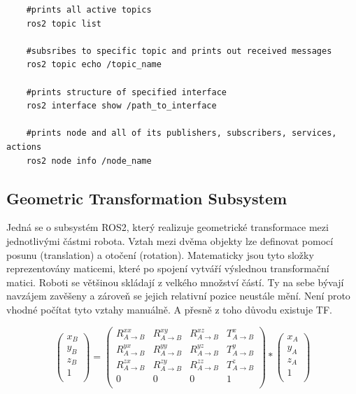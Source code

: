\begin{verbatim}
	#prints all active topics
	ros2 topic list 
	
	#subsribes to specific topic and prints out received messages
	ros2 topic echo /topic_name
	
	#prints structure of specified interface
	ros2 interface show /path_to_interface
	
	#prints node and all of its publishers, subscribers, services, actions
	ros2 node info /node_name
\end{verbatim}

\subsection*{Geometric Transformation Subsystem} \label{theory:tf}
Jedná se o subsystém ROS2, který realizuje geometrické transformace mezi jednotlivými částmi robota.
Vztah mezi dvěma objekty lze definovat pomocí posunu (translation) a otočení (rotation). Matematicky jsou tyto složky reprezentovány maticemi, které po spojení vytváří výslednou transformační matici. Roboti se většinou skládají z velkého množství částí. Ty na sebe bývají navzájem zavěšeny a zároveň se jejich relativní pozice neustále mění. Není proto vhodné počítat tyto vztahy manuálně. A přesně z toho důvodu existuje TF. \cite[str:~63-67]{ros2_introduction}

\begin{equation}
	\begin{pmatrix}
		x_B\\
		y_B\\
		z_B\\
		1\\
	\end{pmatrix}
	=
	\begin{pmatrix}
		R_{A\rightarrow B}^{xx} & R_{A\rightarrow B}^{xy} & R_{A\rightarrow B}^{xz} & T_{A\rightarrow B}^x\\
		R_{A\rightarrow B}^{yx} & R_{A\rightarrow B}^{yy} & R_{A\rightarrow B}^{yz} & T_{A\rightarrow B}^y\\
		R_{A\rightarrow B}^{zx} & R_{A\rightarrow B}^{zy} & R_{A\rightarrow B}^{zz} & T_{A\rightarrow B}^z\\
		0 & 0 & 0 & 1\\
	\end{pmatrix}
	*
	\begin{pmatrix}
		x_A\\
		y_A\\
		z_A\\
		1\\
	\end{pmatrix}
\end{equation}

